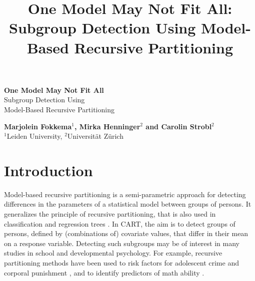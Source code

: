 \documentclass[doc,floatsintext,natbib]{apa7}
\title{One Model May Not Fit All: Subgroup Detection Using Model-Based Recursive Partitioning}
\begin{document}

\renewenvironment{Schunk}{\small}{}



\begin{titlepage}
   \begin{center}
       \vspace*{1cm}

       \textbf{\large One Model May Not Fit All}\\

       \vspace{0.5cm}
        \large Subgroup Detection Using\\Model-Based Recursive Partitioning\\
            
       \vspace{1.5cm}

       \textbf{Marjolein Fokkema$^1$, Mirka Henninger$^2$ and Carolin Strobl$^2$}\\
       $^1$Leiden University, $^2$Universit\"at Z\"urich

       \vfill

            
       \vspace{0.8cm}
     

   \end{center}
\end{titlepage}


\maketitle



\newpage
\section{Introduction}
\label{sec:Introduction}

Model-based recursive partitioning \citep[MOB;][]{ZeilyHoth08} is a semi-parametric approach for detecting differences in the parameters of a statistical model between groups of persons. It generalizes the principle of recursive partitioning, that is also used in classification and regression trees \citep[CART; ][]{Breetal:1984}. In CART, the aim is to detect groups of persons, defined by (combinations of) covariate values, that differ in their mean on a response variable. Detecting such subgroups may be of interest in many studies in school and developmental psychology. For example, recursive partitioning methods have been used to risk factors for adolescent crime \citep{FrityHaup19} and corporal punishment \citep{StemyHein19}, and to identify predictors of math ability \citep{DingyZhao19}.
\end{document}
